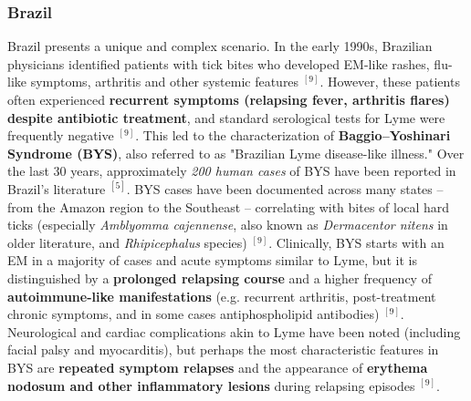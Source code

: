 \documentclass[11pt,letterpaper]{article}
\newcommand{\mycite}[1]{$^{[#1]}$}
\begin{document}
\subsubsection{Brazil}
Brazil presents a unique and complex scenario. In the early 1990s, Brazilian physicians identified patients with tick bites who developed EM-like rashes, flu-like symptoms, arthritis and other systemic features \mycite{9}. However, these patients often experienced \textbf{recurrent symptoms (relapsing fever, arthritis flares) despite antibiotic treatment}, and standard serological tests for Lyme were frequently negative \mycite{9}. This led to the characterization of \textbf{Baggio–Yoshinari Syndrome (BYS)}, also referred to as "Brazilian Lyme disease-like illness." Over the last 30 years, approximately \textit{200 human cases} of BYS have been reported in Brazil's literature \mycite{5}. BYS cases have been documented across many states – from the Amazon region to the Southeast – correlating with bites of local hard ticks (especially \textit{Amblyomma cajennense}, also known as \textit{Dermacentor nitens} in older literature, and \textit{Rhipicephalus} species) \mycite{9}. Clinically, BYS starts with an EM in a majority of cases and acute symptoms similar to Lyme, but it is distinguished by a \textbf{prolonged relapsing course} and a higher frequency of \textbf{autoimmune-like manifestations} (e.g. recurrent arthritis, post-treatment chronic symptoms, and in some cases antiphospholipid antibodies) \mycite{9}. Neurological and cardiac complications akin to Lyme have been noted (including facial palsy and myocarditis), but perhaps the most characteristic features in BYS are \textbf{repeated symptom relapses} and the appearance of \textbf{erythema nodosum and other inflammatory lesions} during relapsing episodes \mycite{9}.
\end{document}

